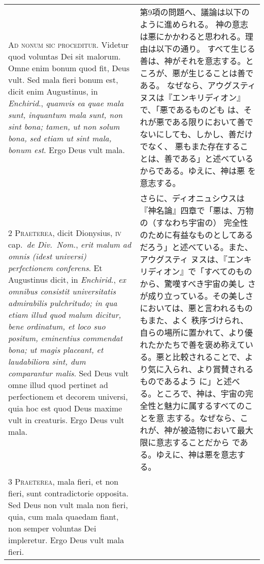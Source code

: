 \documentclass[10pt]{jsarticle} %
\begin{document}
\begin{longtable}{p{21em}p{21em}}

{\huge A}{\scshape d nonum sic proceditur}. Videtur quod
voluntas Dei sit malorum. Omne enim bonum quod fit, Deus vult. Sed mala
fieri bonum est, dicit enim Augustinus, in {\itshape Enchirid}., {\itshape quamvis ea quae
mala sunt, inquantum mala sunt, non sint bona; tamen, ut non solum bona,
sed etiam ut sint mala, bonum est}. Ergo Deus vult mala.

&

第9項の問題へ、議論は以下のように進められる。
神の意志は悪にかかわると思われる。理由は以下の通り。
すべて生じる善は、神がそれを意志する。ところが、悪が生じることは善である。
 なぜなら、アウグスティヌスは『エンキリディオン』で、「悪であるものども
 は、それが悪である限りにおいて善でないにしても、しかし、善だけでなく、
 悪もまた存在することは、善である」と述べているからである。ゆえに、神は悪
 を意志する。

\\


{\scshape 2 Praeterea}, dicit Dionysius, {\scshape iv} cap.~{\itshape de
Div.~Nom.}, {\itshape erit malum ad omnis (idest universi) perfectionem
conferens}. Et Augustinus dicit, in {\itshape Enchirid}., {\itshape ex omnibus consistit
universitatis admirabilis pulchritudo; in qua etiam illud quod malum
dicitur, bene ordinatum, et loco suo positum, eminentius commendat bona;
ut magis placeant, et laudabiliora sint, dum comparantur malis}. Sed Deus
vult omne illud quod pertinet ad perfectionem et decorem universi, quia
hoc est quod Deus maxime vult in creaturis. Ergo Deus vult mala.


&

さらに、ディオニュシウスは『神名論』四章で「悪は、万物の（すなわち宇宙の）
 完全性のために有益なものとしてあるだろう」と述べている。また、アウグスティ
 ヌスは、『エンキリディオン』で「すべてのものから、驚嘆すべき宇宙の美し
 さが成り立っている。その美しさにおいては、悪と言われるものもまた、よく
 秩序づけられ、自らの場所に置かれて、より優れたかたちで善を褒め称えてい
 る。悪と比較されることで、より気に入られ、より賞賛されるものであるよう
 に」と述べる。ところで、神は、宇宙の完全性と魅力に属するすべてのことを意
 志する。なぜなら、これが、神が被造物において最大限に意志することだから
 である。ゆえに、神は悪を意志する。

\\


{\scshape 3 Praeterea}, mala fieri, et non fieri, sunt
contradictorie opposita. Sed Deus non vult mala non fieri, quia, cum
mala quaedam fiant, non semper voluntas Dei impleretur. Ergo Deus vult
mala fieri.



\end{longtable}
\end{document}
